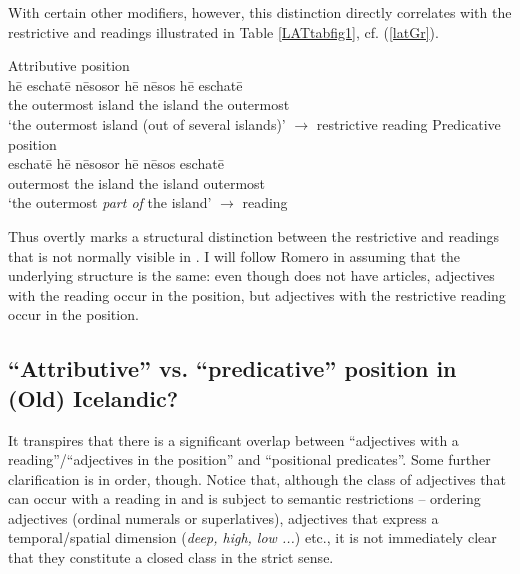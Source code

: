 \documentclass[output=paper,colorlinks,citecolor=brown]{langscibook}
\begin{document}
With certain other modifiers, however, this distinction directly correlates with the restrictive and  readings illustrated in Table \ref{LATtabfig1}, cf. (\ref{latGr}).

\begin{exe}
   \ex \label{latGr}
     \begin{xlist}
         \ex \label{latGra}  Attributive position  \\
             \gll h\={e} eschat\={e} n\={e}sos\hspace{14mm}or\hspace{10mm}  h\={e}  n\={e}sos  h\={e} eschat\={e}  \\ 
               the outermost  island  the   island   the outermost   \\ 
               \glt `the outermost island (out of several islands)'  \hfill $\rightarrow$ restrictive reading
         \ex \label{latGrb}  Predicative position   \\ 
             \gll  eschat\={e} h\={e} n\={e}sos\hspace{14mm}or\hspace{10mm}  h\={e}  n\={e}sos    eschat\={e}  \\ 
               outermost the  island  the  island  outermost    \\
               \glt `the outermost \textit{part of} the  island' \hfill $\rightarrow$  reading
     \end{xlist}
\end{exe} 

Thus  overtly marks a structural distinction between the restrictive and  readings that is not normally visible in . I will follow Romero in assuming that the underlying structure is the same: even though  does not have articles, adjectives with the  reading occur in the  position, but adjectives with the restrictive reading occur in the  position. 


\subsection{``Attributive'' vs. ``predicative'' position in (Old) Icelandic?} 
\label{sec:10:attrPIC}

It transpires that there is a significant overlap between ``adjectives with a  reading''/``adjectives in the  position''  and ``positional predicates''.  Some further clarification is in order, though. Notice that, although the class of adjectives that can occur with a  reading in  and  is subject to semantic restrictions -- ordering adjectives (ordinal numerals or superlatives), adjectives that express a temporal/spatial dimension (\textit{deep, high, low ...}) etc., it is not  immediately clear that they constitute a closed class in the strict sense. %
\end{document}
